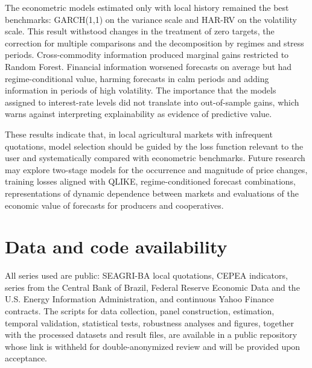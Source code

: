 \documentclass[a4paper,fleqn]{cas-sc}
\begin{document}
The econometric models estimated only with local history remained the best benchmarks: GARCH(1,1) on the variance scale and HAR-RV on the volatility scale. This result withstood changes in the treatment of zero targets, the correction for multiple comparisons and the decomposition by regimes and stress periods. Cross-commodity information produced marginal gains restricted to Random Forest. Financial information worsened forecasts on average but had regime-conditional value, harming forecasts in calm periods and adding information in periods of high volatility. The importance that the models assigned to interest-rate levels did not translate into out-of-sample gains, which warns against interpreting explainability as evidence of predictive value.

These results indicate that, in local agricultural markets with infrequent quotations, model selection should be guided by the loss function relevant to the user and systematically compared with econometric benchmarks. Future research may explore two-stage models for the occurrence and magnitude of price changes, training losses aligned with QLIKE, regime-conditioned forecast combinations, representations of dynamic dependence between markets and evaluations of the economic value of forecasts for producers and cooperatives.




\section*{Data and code availability}
All series used are public: SEAGRI-BA local quotations, CEPEA indicators, series from the Central Bank of Brazil, Federal Reserve Economic Data and the U.S. Energy Information Administration, and continuous Yahoo Finance contracts. The scripts for data collection, panel construction, estimation, temporal validation, statistical tests, robustness analyses and figures, together with the processed datasets and result files, are available in a public repository whose link is withheld for double-anonymized review and will be provided upon acceptance.

%





\end{document}
